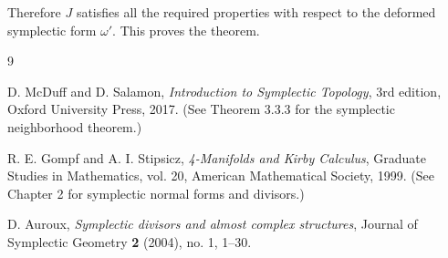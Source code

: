 \documentclass[11pt]{article}
\theoremstyle{definition}
\theoremstyle{remark}
\begin{document}
Therefore \(J\) satisfies all the required properties with respect to the deformed symplectic form \(\omega'\). This proves the theorem.

\begin{thebibliography}{9}

D. McDuff and D. Salamon,
\emph{Introduction to Symplectic Topology},
3rd edition, Oxford University Press, 2017.
\newblock (See Theorem 3.3.3 for the symplectic neighborhood theorem.)

R. E. Gompf and A. I. Stipsicz,
\emph{4-Manifolds and Kirby Calculus},
Graduate Studies in Mathematics, vol. 20, American Mathematical Society, 1999.
\newblock (See Chapter 2 for symplectic normal forms and divisors.)

D. Auroux,
\emph{Symplectic divisors and almost complex structures},
Journal of Symplectic Geometry \textbf{2} (2004), no. 1, 1--30.

\end{thebibliography}
\end{document}
